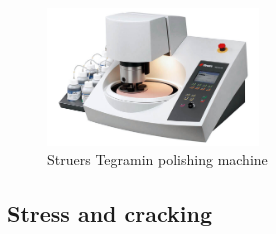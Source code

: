 \begin{figure}[h!]
    \centering
    \includegraphics[width=0.5\textwidth]{fig/polishing/Tegramin.jpg}
    \caption{Struers Tegramin polishing machine}
    \label{fig:tegramin}
\end{figure}


\subsection{Stress and cracking}

